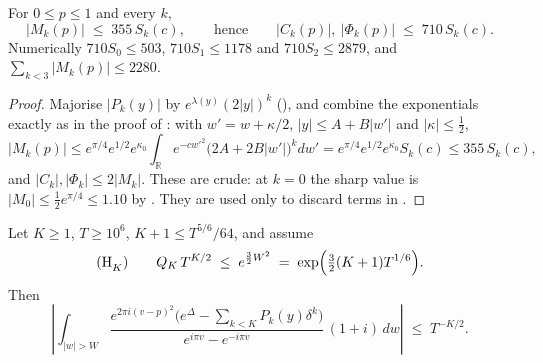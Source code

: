 \begin{corollary}
\label{cor:rsg_correction_bound}
For $0\le p\le1$ and every $k$,
\[
  \lvert M_{k}(p)\rvert\;\le\;355\,S_{k}(c),\qquad\text{hence}\qquad
  \lvert C_{k}(p)\rvert,\ \lvert\Phi_{k}(p)\rvert\;\le\;710\,S_{k}(c).
\]
Numerically $710S_{0}\le503$, $710S_{1}\le1178$ and $710S_{2}\le2879$, and
$\sum_{k<3}\lvert M_{k}(p)\rvert\le2280$.
\end{corollary}

\begin{proof}
Majorise $\lvert P_{k}(y)\rvert$ by $e^{\lambda(y)}(2\lvert y\rvert)^{k}$
(), and combine the exponentials exactly as in the
proof of : with $w'=w+\kappa/2$, $\lvert y\rvert\le A+B\lvert w'\rvert$ and
$\lvert\kappa\rvert\le\tfrac12$,
\[
  \lvert M_{k}(p)\rvert\le e^{\pi/4}e^{1/2}e^{\kappa_{0}}
    \int_{\mathbb{R}}e^{-cw'^{2}}\bigl(2A+2B\lvert w'\rvert\bigr)^{k}dw'
   =e^{\pi/4}e^{1/2}e^{\kappa_{0}}S_{k}(c)\le355\,S_{k}(c),
\]
and $\lvert C_{k}\rvert,\lvert\Phi_{k}\rvert\le2\lvert M_{k}\rvert$.  These are crude: at $k=0$
the sharp value is $\lvert M_{0}\rvert\le\tfrac12e^{\pi/4}\le1.10$ by .
They are used only to discard terms in .
\end{proof}

\begin{lemma}
\label{lem:rsg_outer}
Let $K\ge1$, $T\ge10^{6}$, $K+1\le T^{5/6}/64$, and assume
\[
  \text{(H}_{K}\text{)}\qquad Q_{K}\,T^{K/2}\;\le\;e^{\frac32W^{2}}
  \;=\;\exp\Bigl(\tfrac32(K+1)T^{1/6}\Bigr).
\]
Then
\[
  \left\lvert\int_{\lvert w\rvert>W}
    \frac{e^{2\pi i(v-p)^{2}}\bigl(e^{\Delta}-\sum_{k<K}P_{k}(y)\delta^{k}\bigr)}
         {e^{i\pi v}-e^{-i\pi v}}\,(1+i)\,dw
  \right\rvert\;\le\;T^{-K/2}.
\]
\end{lemma}

